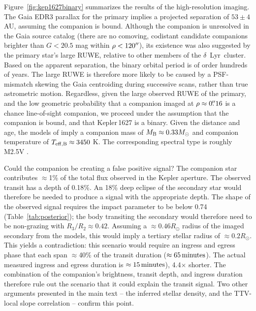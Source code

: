 \documentclass[12pt,modern,twocolumn,tighten]{aastex63}
\newcommand{\cn}{$\delta$\ Lyr\ cluster} %
\begin{document}
Figure~\ref{fig:kep1627binary} summarizes the results of the
high-resolution imaging.  The Gaia EDR3 parallax for the primary
implies a projected separation of $53 \pm 4$\,AU, assuming the
companion is bound.  Although the companion is unresolved in the Gaia
source catalog (there are no comoving, codistant candidate companions brighter than $G < 20.5$ mag
within $\rho < 120\mbox{$^{\prime\prime}$}$), its existence was also suggested by the
primary star's large RUWE, relative to other members of the \cn.
Based on the apparent separation, the binary orbital period is of
order hundreds of years.  The large RUWE is therefore more likely to
be caused by a PSF-mismatch skewing the Gaia centroiding during
successive scans, rather than true astrometric motion.  Regardless,
given the large observed RUWE of the primary, and the low geometric
probability that a companion imaged at $\rho \approx 0\mbox{$.\!\!^{\prime\prime}$}16$ is a
chance line-of-sight companion, we proceed under the assumption that
the companion is bound, and that Kepler\,1627 is a binary.  Given the
distance and age, the models of \citet{baraffe_new_2015} imply a
companion mass of $M_{\rm B} \approx 0.33 M_{\odot}$ and companion
temperature of $T_{\rm eff,B} \approx 3450$ K.  The corresponding
spectral type is roughly M2.5V \citep{pecaut_mamajek_2013}.

Could the companion be creating a false positive signal?  The
companion star contributes $\approx$1\% of the total flux observed in
the Kepler aperture.  The observed transit has a depth of 0.18\%.  An
18\% deep eclipse of the secondary star would therefore be needed to
produce a signal with the appropriate depth.  The shape of the
observed signal requires the impact parameter to be below 0.74
(Table~\ref{tab:posterior}); the body transiting the secondary would
therefore need to be non-grazing with $R_3/R_2 \approx 0.42$.
Assuming a $\approx 0.46R_\odot$ radius of the imaged secondary
from the \citet{baraffe_new_2015} models, this
would imply a tertiary stellar radius of $\approx 0.2R_\odot$.  This
yields a contradiction:  this scenario would require an ingress and
egress phase that each span $\approx$40\% of the transit duration
($\approx 65\,{\rm minutes}$).  The actual measured ingress and egress
duration is $\approx 15\,{\rm minutes}$), 4.4$\times$ shorter.  The
combination of the companion's brightness, transit depth, and ingress
duration therefore rule out the scenario that it could explain the
transit signal.  Two other arguments presented in the main text -- the
inferred stellar density, and the TTV-local slope correlation --
confirm this point.
\end{document}
